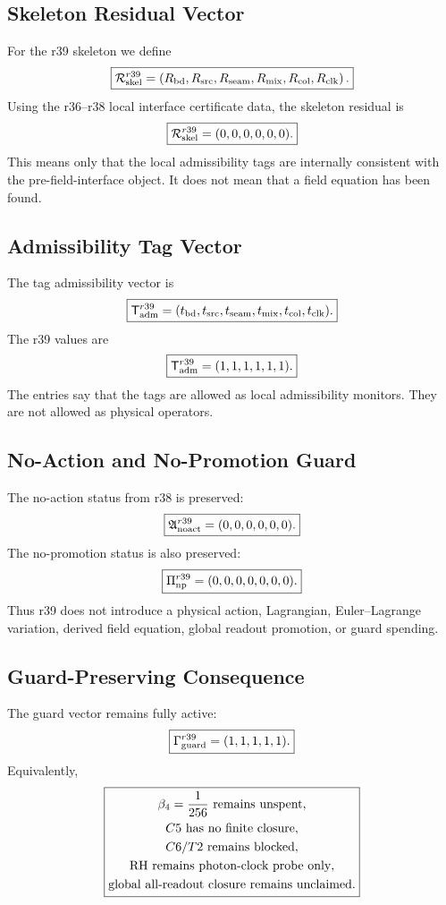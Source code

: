 \subsection{Skeleton Residual Vector}
\label{subsec:r39-skeleton-residual-vector}

For the r39 skeleton we define
\[
\boxed{
\mathcal R_{\rm skel}^{r39}
=
\left(
R_{\rm bd},R_{\rm src},R_{\rm seam},R_{\rm mix},R_{\rm col},R_{\rm clk}
\right).
}
\]
Using the r36--r38 local interface certificate data, the skeleton residual is
\[
\boxed{
\mathcal R_{\rm skel}^{r39}=(0,0,0,0,0,0).
}
\]
This means only that the local admissibility tags are internally consistent with
the pre-field-interface object.  It does not mean that a field equation has been
found.

\subsection{Admissibility Tag Vector}
\label{subsec:r39-admissibility-tag-vector}

The tag admissibility vector is
\[
\boxed{
\mathsf T_{\rm adm}^{r39}
=
(t_{\rm bd},t_{\rm src},t_{\rm seam},t_{\rm mix},t_{\rm col},t_{\rm clk}).
}
\]
The r39 values are
\[
\boxed{
\mathsf T_{\rm adm}^{r39}=(1,1,1,1,1,1).
}
\]
The entries say that the tags are allowed as local admissibility monitors.  They
are not allowed as physical operators.

\subsection{No-Action and No-Promotion Guard}
\label{subsec:r39-no-action-no-promotion-guard}

The no-action status from r38 is preserved:
\[
\boxed{
\mathfrak A_{\rm noact}^{r39}=(0,0,0,0,0,0).
}
\]
The no-promotion status is also preserved:
\[
\boxed{
\Pi_{\rm np}^{r39}=(0,0,0,0,0,0,0).
}
\]
Thus r39 does not introduce a physical action, Lagrangian, Euler--Lagrange
variation, derived field equation, global readout promotion, or guard spending.

\subsection{Guard-Preserving Consequence}
\label{subsec:r39-guard-preserving-consequence}

The guard vector remains fully active:
\[
\boxed{
\Gamma_{\rm guard}^{r39}=(1,1,1,1,1).
}
\]
Equivalently,
\[
\boxed{
\begin{gathered}
\beta_4={1\over256}\hbox{ remains unspent},\\
C5\hbox{ has no finite closure},\\
C6/T2\hbox{ remains blocked},\\
\mathrm{RH}\hbox{ remains photon-clock probe only},\\
\hbox{global all-readout closure remains unclaimed}.
\end{gathered}
}
\]


